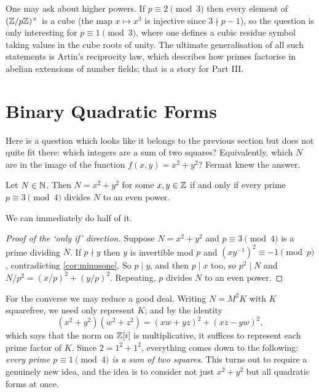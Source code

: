 \documentclass[a4paper]{scrartcl}
\begin{document}
\begin{remark}
	One may ask about higher powers. If $p \equiv 2 \pmod 3$ then every element of $(\mathbb{Z}/p\mathbb{Z})^\times$ is a cube (the map $x \mapsto x^3$ is injective since $3 \nmid p-1$), so the question is only interesting for $p \equiv 1 \pmod 3$, where one defines a cubic residue symbol taking values in the cube roots of unity. The ultimate generalisation of all such statements is Artin's reciprocity law, which describes how primes factorise in abelian extensions of number fields; that is a story for Part III.
\end{remark}

\section{Binary Quadratic Forms}

Here is a question which looks like it belongs to the previous section but does not quite fit there: which integers are a sum of two squares? Equivalently, which $N$ are in the image of the function $f(x,y) = x^2 + y^2$? Fermat knew the answer.

\begin{theorem}\label{nt-thm:twosquares}
	Let $N \in \mathbb{N}$. Then $N = x^2 + y^2$ for some $x, y \in \mathbb{Z}$ if and only if every prime $p \equiv 3 \pmod 4$ divides $N$ to an even power.
\end{theorem}

We can immediately do half of it.

\begin{proof}[Proof of the `only if' direction]
	Suppose $N = x^2 + y^2$ and $p \equiv 3 \pmod 4$ is a prime dividing $N$. If $p \nmid y$ then $y$ is invertible mod $p$ and $(xy^{-1})^2 \equiv -1 \pmod p$, contradicting \autoref{cor:minusone}. So $p \mid y$, and then $p \mid x$ too, so $p^2 \mid N$ and $N/p^2 = (x/p)^2 + (y/p)^2$. Repeating, $p$ divides $N$ to an even power.
\end{proof}

For the converse we may reduce a good deal. Writing $N = M^2 K$ with $K$ squarefree, we need only represent $K$; and by the identity
$$
(x^2 + y^2)(w^2 + z^2) = (xw + yz)^2 + (xz - yw)^2,
$$
which says that the norm on $\mathbb{Z}[i]$ is multiplicative, it suffices to represent each prime factor of $K$. Since $2 = 1^2 + 1^2$, everything comes down to the following: \emph{every prime $p \equiv 1 \pmod 4$ is a sum of two squares}. This turns out to require a genuinely new idea, and the idea is to consider not just $x^2 + y^2$ but all quadratic forms at once.
\end{document}
